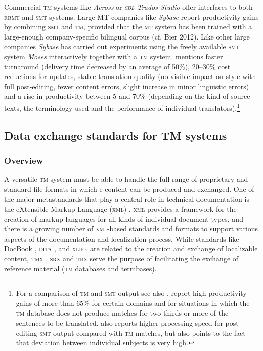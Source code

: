 \documentclass[output=paper]{LSP/langsci}
\begin{document}
Commercial \textsc{tm} systems like \textit{Across} or \textit{\textsc{sdl} Trados Studio} offer interfaces to both \textsc{rbmt} and \textsc{smt} systems. Large \textsc{MT} companies like \textit{Sybase} report productivity gains by combining \textsc{smt} and \textsc{tm}, provided that the \textsc{mt} system has been trained with a large-enough company-specific bilingual corpus (cf. Bier 2012). Like other large companies \textit{Sybase} has carried out experiments using the freely available \textsc{smt} system \textit{Moses} \citep{KoehnEtAl2007} interactively together with a \textsc{tm} system. \citet{Bier2012} mentions faster turnaround (delivery time decreased by an average of 50\%), 20--30\% cost reductions for updates, stable translation quality (no visible impact on style with full post-editing, fewer content errors, slight increase in minor linguistic errors) and a rise in productivity between 5 and 70\% (depending on the kind of source texts, the terminology used and the performance of individual translators).\footnote{For a comparison of \textsc{tm} and \textsc{smt} output see also \citet{OffersgaardEtAl2008}.
\citeauthor{OffersgaardEtAl2008} report high productivity gains of more than 65\% for certain domains and for situations in which the \textsc{tm} database does not produce matches for two thirds or more of the sentences to be translated. \citet{Guerberof2009} also reports higher processing speed for post-editing \textsc{smt} output compared with \textsc{tm} matches, but also points to the fact that deviation between individual subjects is very high.}

\subsection{Data exchange standards for TM systems}\label{sec:reinke:2.5}
\subsubsection{Overview}\label{sec:reinke:2.5.1}
 
A versatile \textsc{tm} system must be able to handle the full range of proprietary and standard file formats in which e-content can be produced and exchanged. One of the major metastandards that play a central role in technical documentation is the eXtensible Markup Language (\textsc{xml}) \citep{W3C2008}. \textsc{xml} provides a framework for the creation of markup languages for all kinds of individual document types, and there is a growing number of \textsc{xml}-based standards and formats to support various aspects of the documentation and localization process. While standards like DocBook \citep{OASIS2006}, \textsc{dita} \citep{OASIS2007}, and \textsc{xliff} \citep{OASIS2008} are related to the creation and exchange of localizable content, \textsc{tmx} \citep{LISA2005}, \textsc{srx} \citep{LISA2008} and \textsc{tbx} \citep{ISO2008} serve the purpose of facilitating the exchange of reference material (\textsc{tm} databases and termbases). 
 
\end{document}
